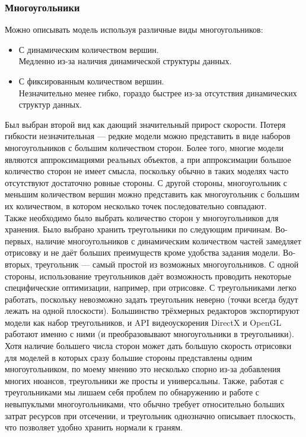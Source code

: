 \documentclass[a4paper,12pt]{report}
\begin{document}
\subsubsection{Многоугольники}
Можно описывать модель используя различные виды многоугольников:
\begin{itemize}
\item С динамическим количеством вершин. \\
Медленно из-за наличия динамической структуры данных.
\item С фиксированным количеством вершин. \\
Незначительно менее гибко, гораздо быстрее из-за отсутствия динамических структур данных.
\end{itemize}
Был выбран второй вид как дающий значительный прирост скорости. Потеря гибкости незначительная --- редкие модели можно представить в виде наборов многоугольников с большим количеством сторон. Более того, многие модели являются аппроксимациями реальных объектов, а при аппроксимации большое количество сторон не имеет смысла, поскольку обычно в таких моделях часто отсутствуют достаточно ровные стороны. С другой стороны, многоугольник с меньшим количеством вершин можно представить как многоугольник с большим их количеством, в котором несколько точек последовательно совпадают. \\
Также необходимо было выбрать количество сторон у многоугольников для хранения. Было выбрано хранить треугольники по следующим причинам. Во-первых, наличие многоугольников с динамическим количеством частей замедляет отрисовку и не даёт больших преимуществ кроме удобства задания модели. Во-вторых, треугольник --- самый простой из возможных многоугольников. С одной стороны, использование треугольников даёт возможность проводить некоторые специфические оптимизации, например, при отрисовке. С треугольниками легко работать, поскольку невозможно задать треугольник неверно (точки всегда будут лежать на одной плоскости). Большинство трёхмерных редакторов экспортируют модели как набор треугольников, и API видеоускорения DirectX и OpenGL работают именно с ними (и преобразовывают многоугольники в треугольники). Хотя наличие большего числа сторон может дать большую скорость отрисовки для моделей в которых сразу большие стороны представлены одним многоугольником, по моему мнению это несколько спорно из-за добавления многих нюансов, треугольники же просты и универсальны. Также, работая с треугольниками мы лишаем себя проблем по обнаружению и работе с невыпуклыми многоугольниками, что обычно требует относительно больших затрат ресурсов при отсечении, и треугольник однозначно описывает плоскость, что позволяет удобно хранить нормали к граням.
\end{document}
